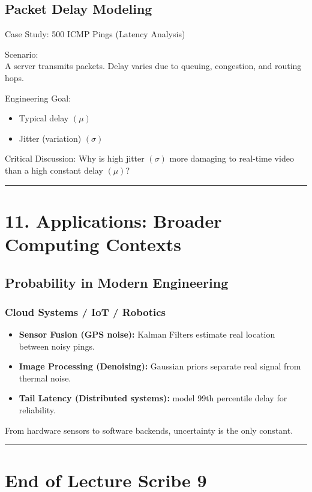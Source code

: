 \documentclass[12pt]{article}
\begin{document}
\subsection*{\textbf{Packet Delay Modeling}}

Case Study: 500 ICMP Pings (Latency Analysis)

Scenario:\\
A server transmits packets. Delay varies due to queuing, congestion, and routing hops.

Engineering Goal:

\begin{itemize}
    \item Typical delay $(\mu)$
    \item Jitter (variation) $(\sigma)$
\end{itemize}

Critical Discussion: Why is high jitter $(\sigma)$ more damaging to real-time video than a high constant delay $(\mu)$?

\hrule
\vspace{1em}

\section*{\textbf{11. Applications: Broader Computing Contexts}}

\subsection*{\textbf{Probability in Modern Engineering}}

\subsubsection*{\textbf{Cloud Systems / IoT / Robotics}}

\begin{itemize}
    \item \textbf{Sensor Fusion (GPS noise):} Kalman Filters estimate real location between noisy pings.
    \item \textbf{Image Processing (Denoising):} Gaussian priors separate real signal from thermal noise.
    \item \textbf{Tail Latency (Distributed systems):} model 99th percentile delay for reliability.
\end{itemize}

From hardware sensors to software backends, uncertainty is the only constant.

\hrule
\vspace{1em}

\section*{\textbf{End of Lecture Scribe 9}}
\end{document}
